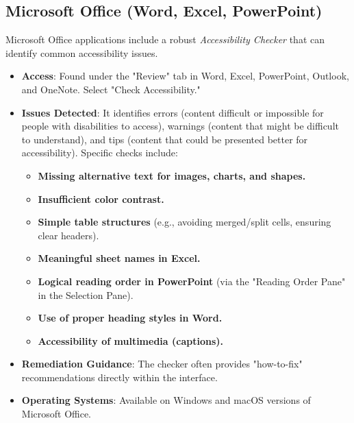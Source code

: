 \subsection{Microsoft Office (Word, Excel, PowerPoint)}
\label{subsec:microsoft-office}
Microsoft Office applications include a robust \emph{Accessibility Checker} \cite{msaccessibilitychecker} that can identify common accessibility issues.
\begin{itemize}
    \item \textbf{Access}: Found under the "Review" tab in Word, Excel, PowerPoint, Outlook, and OneNote. Select "Check Accessibility."

    \item \textbf{Issues Detected}: It identifies errors (content difficult or impossible for people with disabilities to access), warnings (content that might be difficult to understand), and tips (content that could be presented better for accessibility). Specific checks include:

        \begin{itemize}
            \item \textbf{Missing alternative text for images, charts, and shapes.}
            \item \textbf{Insufficient color contrast.}
            \item \textbf{Simple table structures} (e.g., avoiding merged/split cells, ensuring clear headers).
            \item \textbf{Meaningful sheet names in Excel.}
            \item \textbf{Logical reading order in PowerPoint} (via the "Reading Order Pane" in the Selection Pane).
            \item \textbf{Use of proper heading styles in Word.}
            \item \textbf{Accessibility of multimedia (captions).}
        \end{itemize}

    \item \textbf{Remediation Guidance}: The checker often provides "how-to-fix" recommendations directly within the interface.

    \item \textbf{Operating Systems}: Available on Windows and macOS versions of Microsoft Office.

\end{itemize}

